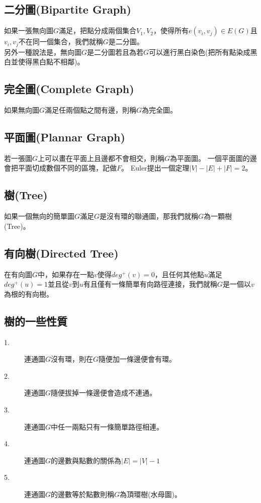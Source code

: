 \documentclass{article}
\begin{document}
\subsection{二分圖(Bipartite Graph)}
如果一張無向圖$G$滿足，把點分成兩個集合$V_1,V_2$，使得所有$e(v_i,v_j) \in E(G)$且$v_i,v_j$不在同一個集合，我們就稱$G$是二分圖。\\
另外一種說法是，無向圖$G$是二分圖若且為若$G$可以進行黑白染色(把所有點染成黑白並使得黑白點不相鄰)。

\subsection{完全圖(Complete Graph)}
如果無向圖$G$滿足任兩個點之間有邊，則稱$G$為完全圖。

\subsection{平面圖(Plannar Graph)}
若一張圖$G$上可以畫在平面上且邊都不會相交，則稱$G$為平面圖。
一個平面圖的邊會把平面切成數個不同的區塊，記做$F$。
Euler提出一個定理$|V|-|E|+|F|=2$。

\subsection{樹(Tree)}
如果一個無向的簡單圖$G$滿足$G$是沒有環的聯通圖，那我們就稱$G$為一顆樹(Tree)。

\subsection{有向樹(Directed Tree)}
在有向圖$G$中，如果存在一點$v$使得$deg^+(v)=0$，且任何其他點$u$滿足$deg^+(u)=1$並且從$v$到$u$有且僅有一條簡單有向路徑連接，我們就稱$G$是一個以$v$為根的有向樹。

\subsection{樹的一些性質}
\begin{description}
\item[ 1.]連通圖$G$沒有環，則在$G$隨便加一條邊便會有環。
\item[ 2.]連通圖$G$隨便拔掉一條邊便會造成不連通。
\item[ 3.]連通圖$G$中任一兩點只有一條簡單路徑相連。
\item[ 4.]連通圖$G$的邊數與點數的關係為$|E| = |V| -1$
\item[ 5.]連通圖$G$的邊數等於點數則稱$G$為頂環樹(水母圖)。
\end{description}
\end{document}
